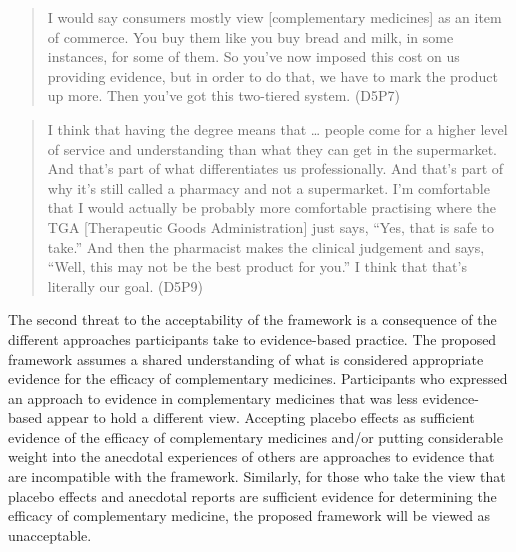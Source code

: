 \documentclass[12pt,]{article}
\begin{document}
\begin{quote}
I would say consumers mostly view {[}complementary medicines{]} as an
item of commerce. You buy them like you buy bread and milk, in some
instances, for some of them. So you've now imposed this cost on us
providing evidence, but in order to do that, we have to mark the product
up more. Then you've got this two-tiered system. (D5P7)
\end{quote}

\begin{quote}
I think that having the degree means that \ldots{} people come for a
higher level of service and understanding than what they can get in the
supermarket. And that's part of what differentiates us professionally.
And that's part of why it's still called a pharmacy and not a
supermarket. I'm comfortable that I would actually be probably more
comfortable practising where the TGA {[}Therapeutic Goods
Administration{]} just says, ``Yes, that is safe to take.'' And then the
pharmacist makes the clinical judgement and says, ``Well, this may not
be the best product for you.'' I think that that's literally our goal.
(D5P9)
\end{quote}

The second threat to the acceptability of the framework is a consequence
of the different approaches participants take to evidence-based
practice. The proposed framework assumes a shared understanding of what
is considered appropriate evidence for the efficacy of complementary
medicines. Participants who expressed an approach to evidence in
complementary medicines that was less evidence-based appear to hold a
different view. Accepting placebo effects as sufficient evidence of the
efficacy of complementary medicines and/or putting considerable weight
into the anecdotal experiences of others are approaches to evidence that
are incompatible with the framework. Similarly, for those who take the
view that placebo effects and anecdotal reports are sufficient evidence
for determining the efficacy of complementary medicine, the proposed
framework will be viewed as unacceptable.
\end{document}
